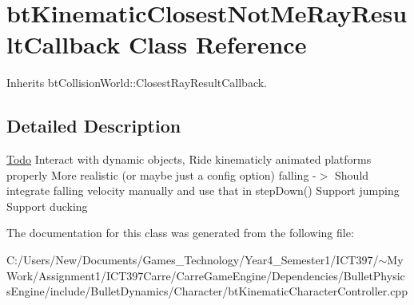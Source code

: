 \hypertarget{classbt_kinematic_closest_not_me_ray_result_callback}{
\section{btKinematicClosestNotMeRayResultCallback Class Reference}
\label{classbt_kinematic_closest_not_me_ray_result_callback}
}
Inherits btCollisionWorld::ClosestRayResultCallback.



\subsection{Detailed Description}
\begin{Desc}
\item[\hyperlink{todo__todo000027}{Todo}]Interact with dynamic objects, Ride kinematicly animated platforms properly More realistic (or maybe just a config option) falling -$>$ Should integrate falling velocity manually and use that in stepDown() Support jumping Support ducking \end{Desc}


The documentation for this class was generated from the following file:\begin{CompactItemize}
\item 
C:/Users/New/Documents/Games\_\-Technology/Year4\_\-Semester1/ICT397/$\sim$My Work/Assignment1/ICT397Carre/CarreGameEngine/Dependencies/BulletPhysicsEngine/include/BulletDynamics/Character/btKinematicCharacterController.cpp\end{CompactItemize}
